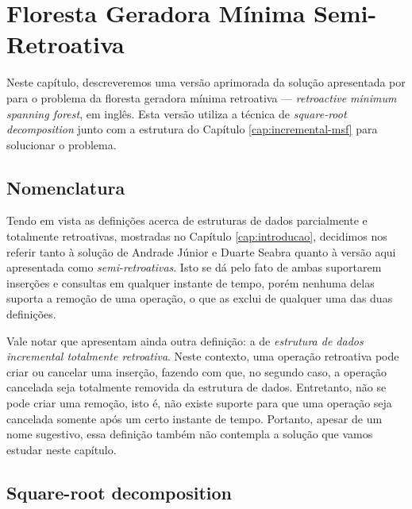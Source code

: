 
\chapter{Floresta Geradora Mínima Semi-Retroativa}
\label{cap:retroactive-msf}

Neste capítulo, descreveremos uma versão aprimorada da solução apresentada por \citet{10.1093/comjnl/bxaa135} para o problema da floresta geradora mínima retroativa --- \emph{retroactive minimum spanning forest}, em inglês. Esta versão utiliza a técnica de \emph{square-root decomposition} junto com a estrutura do Capítulo \ref{cap:incremental-msf} para solucionar o problema.

\section{Nomenclatura}
\label{sec:nomeclatura}


Tendo em vista as definições acerca de estruturas de dados parcialmente e totalmente retroativas, mostradas no Capítulo \ref{cap:introducao}, decidimos nos referir tanto à solução de Andrade Júnior e Duarte Seabra quanto à versão aqui apresentada como \emph{semi-retroativas}. Isto se dá pelo fato de ambas suportarem inserções e consultas em qualquer instante de tempo, porém nenhuma delas suporta a remoção de uma operação, o que as exclui de qualquer uma das duas definições.

Vale notar que \citet{DBLP:journals/corr/abs-1910-03332} apresentam ainda outra definição: a de \emph{estrutura de dados incremental totalmente retroativa}. Neste contexto, uma operação retroativa pode criar ou cancelar uma inserção, fazendo com que, no segundo caso, a operação cancelada seja totalmente removida da estrutura de dados. Entretanto, não se pode criar uma remoção, isto é, não existe suporte para que uma operação seja cancelada somente após um certo instante de tempo. Portanto, apesar de um nome sugestivo, essa definição também não contempla a solução que vamos estudar neste capítulo.

\section{Square-root decomposition}
\label{sec:sqrt-decomp}

